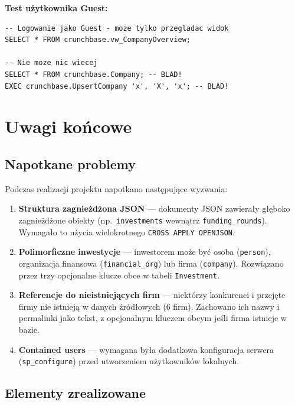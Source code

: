 \documentclass[12pt,a4paper]{article}
\begin{document}
\textbf{Test użytkownika Guest:}
\begin{lstlisting}
-- Logowanie jako Guest - moze tylko przegladac widok
SELECT * FROM crunchbase.vw_CompanyOverview;

-- Nie moze nic wiecej
SELECT * FROM crunchbase.Company; -- BLAD!
EXEC crunchbase.UpsertCompany 'x', 'X', 'x'; -- BLAD!
\end{lstlisting}

\newpage
\section{Uwagi końcowe}

\subsection{Napotkane problemy}

Podczas realizacji projektu napotkano następujące wyzwania:

\begin{enumerate}
    \item \textbf{Struktura zagnieżdżona JSON} --- dokumenty JSON zawierały głęboko zagnieżdżone obiekty (np.\ \texttt{investments} wewnątrz \texttt{funding\_rounds}). Wymagało to użycia wielokrotnego \texttt{CROSS APPLY OPENJSON}.

    \item \textbf{Polimorficzne inwestycje} --- inwestorem może być osoba (\texttt{person}), organizacja finansowa (\texttt{financial\_org}) lub firma (\texttt{company}). Rozwiązano przez trzy opcjonalne klucze obce w tabeli \texttt{Investment}.

    \item \textbf{Referencje do nieistniejących firm} --- niektórzy konkurenci i przejęte firmy nie istnieją w danych źródłowych (6 firm). Zachowano ich nazwy i permalinki jako tekst, z opcjonalnym kluczem obcym jeśli firma istnieje w bazie.

    \item \textbf{Contained users} --- wymagana była dodatkowa konfiguracja serwera (\texttt{sp\_configure}) przed utworzeniem użytkowników lokalnych.
\end{enumerate}

\subsection{Elementy zrealizowane}
\end{document}
